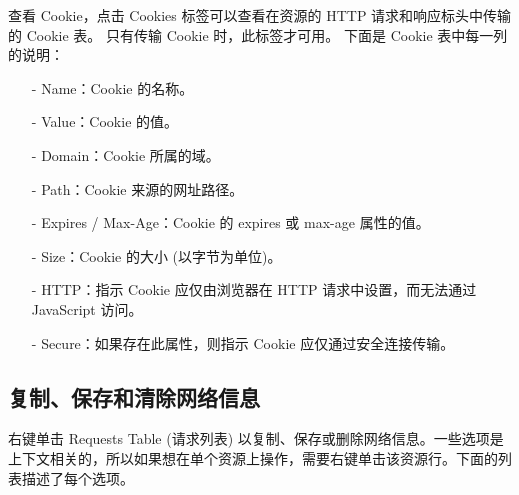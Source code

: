 查看 Cookie，点击 Cookies 标签可以查看在资源的 HTTP 请求和响应标头中传输的 Cookie 表。 只有传输 Cookie 时，此标签才可用。
下面是 Cookie 表中每一列的说明：

\begin{itemize}
\item [-] Name：Cookie 的名称。
\item [-] Value：Cookie 的值。
\item [-] Domain：Cookie 所属的域。
\item [-] Path：Cookie 来源的网址路径。
\item [-] Expires / Max-Age：Cookie 的 expires 或 max-age 属性的值。
\item [-] Size：Cookie 的大小 (以字节为单位)。
\item [-] HTTP：指示 Cookie 应仅由浏览器在 HTTP 请求中设置，而无法通过 JavaScript 访问。
\item [-] Secure：如果存在此属性，则指示 Cookie 应仅通过安全连接传输。
\end{itemize}

\subsection{复制、保存和清除网络信息}

右键单击 Requests Table (请求列表) 以复制、保存或删除网络信息。一些选项是上下文相关的，所以如果想在单个资源上操作，需要右键单击该资源行。下面的列表描述了每个选项。

